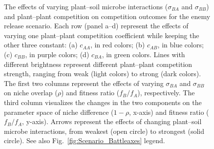 \clearpage
\begin{figure}[htbp]
	\centering
	\caption[The effects of varying plant--soil microbe interactions ($\sigma_{BA}$ and $\sigma_{BB}$) and plant--plant competition on competition outcomes for the enemy release scenario.]
		{The effects of varying plant--soil microbe interactions ($\sigma_{BA}$ and $\sigma_{BB}$) and plant--plant competition on competition outcomes for the enemy release scenario.
		Each row (panel a--d) represent the effects of varying one plant--plant competition coefficient while keeping the other three constant: (a) $c_{AA}$, in red colors; (b) $c_{AB}$, in blue colors; (c) $c_{BB}$, in purple colors; (d) $c_{BA}$, in green colors. Lines with different brightness represent different plant--plant competition strength, ranging from weak (light colors) to strong (dark colors).
		The first two columns represent the effects of varying $\sigma_{BA}$ and $\sigma_{BB}$ on niche overlap ($\rho$) and fitness ratio ($f_{B}/f_{A}$), respectively. The third column visualizes the changes in the two components on the parameter space of niche difference ($1 - \rho$, x-axis) and fitness ratio ($f_{B}/f_{A}$, y-axis). Arrows represent the effects of changing plant--soil microbe interactions, from weakest (open circle) to strongest (solid circle). See also Fig.~\ref{fig:Scenario_Battleaxes} legend.}
	\label{fig:Enemy_Release_everything}
\end{figure}



